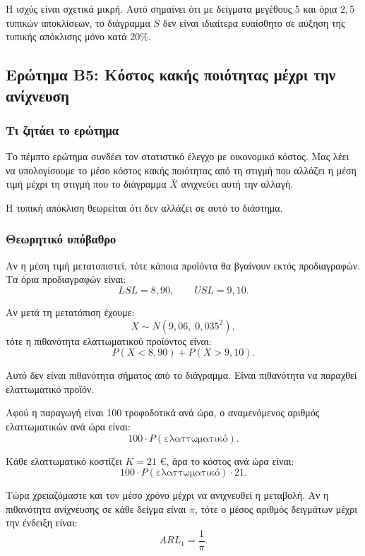 \documentclass[12pt,a4paper]{article}
\begin{document}
Η ισχύς είναι σχετικά μικρή. Αυτό σημαίνει ότι με δείγματα μεγέθους 5 και
όρια \(2{,}5\) τυπικών αποκλίσεων, το διάγραμμα \(S\) δεν είναι ιδιαίτερα
ευαίσθητο σε αύξηση της τυπικής απόκλισης μόνο κατά 20\%.

\subsection{Ερώτημα Β5: Κόστος κακής ποιότητας μέχρι την ανίχνευση}

\subsubsection*{Τι ζητάει το ερώτημα}

Το πέμπτο ερώτημα συνδέει τον στατιστικό έλεγχο με οικονομικό κόστος. Μας λέει
να υπολογίσουμε το μέσο κόστος κακής ποιότητας από τη στιγμή που αλλάζει η μέση
τιμή μέχρι τη στιγμή που το διάγραμμα \(\bar X\) ανιχνεύει αυτή την αλλαγή.

Η τυπική απόκλιση θεωρείται ότι δεν αλλάζει σε αυτό το διάστημα.

\subsubsection*{Θεωρητικό υπόβαθρο}

Αν η μέση τιμή μετατοπιστεί, τότε κάποια προϊόντα θα βγαίνουν εκτός
προδιαγραφών. Τα όρια προδιαγραφών είναι:
\[
    LSL=8{,}90,\qquad USL=9{,}10.
\]

Αν μετά τη μετατόπιση έχουμε:
\[
    X\sim N(9{,}06,\;0{,}035^2),
\]
τότε η πιθανότητα ελαττωματικού προϊόντος είναι:
\[
    P(X<8{,}90)+P(X>9{,}10).
\]

Αυτό δεν είναι πιθανότητα σήματος από το διάγραμμα. Είναι πιθανότητα να
παραχθεί ελαττωματικό προϊόν.

Αφού η παραγωγή είναι 100 τροφοδοτικά ανά ώρα, ο αναμενόμενος αριθμός
ελαττωματικών ανά ώρα είναι:
\[
    100\cdot P(\text{ελαττωματικό}).
\]

Κάθε ελαττωματικό κοστίζει \(K=21\) €, άρα το κόστος ανά ώρα είναι:
\[
    100\cdot P(\text{ελαττωματικό})\cdot 21.
\]

Τώρα χρειαζόμαστε και τον μέσο χρόνο μέχρι να ανιχνευθεί η μεταβολή. Αν η
πιθανότητα ανίχνευσης σε κάθε δείγμα είναι \(\pi\), τότε ο μέσος αριθμός
δειγμάτων μέχρι την ένδειξη είναι:
\[
    ARL_1=\frac{1}{\pi}.
\]
\end{document}
